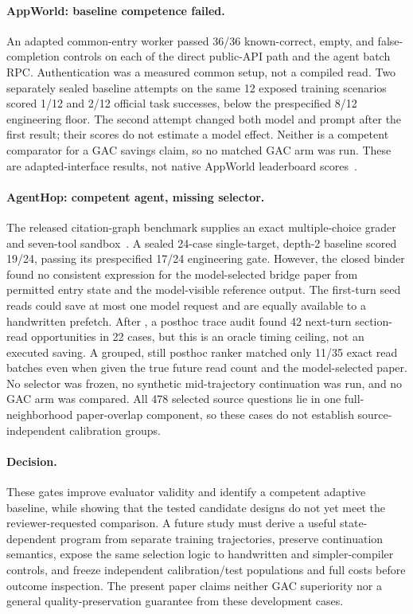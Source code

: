 \paragraph{AppWorld: baseline competence failed.}
An adapted common-entry worker passed 36/36 known-correct, empty, and
false-completion controls on each of the direct public-API path and the
agent batch RPC. Authentication was a measured common setup, not a compiled
read. Two separately sealed baseline attempts on the same 12 exposed
training scenarios scored 1/12 and 2/12 official task successes, below the
prespecified 8/12 engineering floor. The second attempt changed both model
and prompt after the first result; their scores do not estimate a model
effect. Neither is a competent comparator for a GAC savings claim, so no
matched GAC arm was run. These are adapted-interface results, not native
AppWorld leaderboard scores~\citep{trivedi2024appworld}.

\paragraph{AgentHop: competent agent, missing selector.}
The released citation-graph benchmark supplies an exact multiple-choice
grader and seven-tool sandbox~\citep{park2026agenthop}. A sealed 24-case
single-target, depth-2 baseline scored 19/24, passing its prespecified 17/24
engineering gate. However, the closed binder found no consistent expression
for the model-selected bridge paper from permitted entry state and the
model-visible reference output. The first-turn seed reads could save at most
one model request and are equally available to a handwritten prefetch.
After , a posthoc trace audit found 42 next-turn
section-read opportunities in 22 cases, but this is an oracle timing ceiling,
not an executed saving. A grouped, still posthoc ranker matched only 11/35
exact read batches even when given the true future read count and the
model-selected paper. No selector was frozen, no synthetic mid-trajectory
continuation was run, and no GAC arm was compared. All 478 selected source
questions lie in one full-neighborhood paper-overlap component, so these
cases do not establish source-independent calibration groups.

\paragraph{Decision.}
These gates improve evaluator validity and identify a competent adaptive
baseline, while showing that the tested candidate designs do not yet meet
the reviewer-requested comparison. A future study must derive a useful
state-dependent program from separate training trajectories, preserve
continuation semantics, expose the same selection logic to handwritten and
simpler-compiler controls, and freeze independent calibration/test populations
and full costs before outcome inspection. The present paper claims neither
GAC superiority nor a general quality-preservation guarantee from these
development cases.
